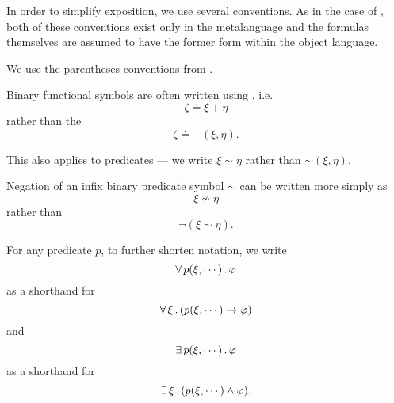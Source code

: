 \begin{remark}\label{rem:first_order_formula_conventions}
  In order to simplify exposition, we use several conventions. As in the case of , both of these conventions exist only in the metalanguage and the formulas themselves are assumed to have the former form within the object language.
  \begin{thmenum}
     We use the parentheses conventions from .

     Binary functional symbols are often written using , i.e.
    \begin{equation*}
      \zeta \doteq \xi + \eta
    \end{equation*}
    rather than the 
    \begin{equation*}
      \zeta \doteq +(\xi, \eta).
    \end{equation*}

    This also applies to predicates --- we write \( \xi \sim \eta \) rather than \( \sim(\xi, \eta) \).

     Negation of an infix binary predicate symbol \( \sim \) can be written more simply as
    \begin{equation*}
      \xi \not\sim \eta
    \end{equation*}
    rather than
    \begin{equation*}
      \neg(\xi \sim \eta).
    \end{equation*}

     For any predicate \( p \), to further shorten notation, we write
    \begin{equation*}
      \forall \thinspace p(\xi, \cdots) \thinspace . \thinspace \varphi
    \end{equation*}
    as a shorthand for
    \begin{equation*}
      \forall \thinspace \xi \thinspace . \thinspace (p(\xi, \cdots) \rightarrow \varphi)
    \end{equation*}
    and
    \begin{equation*}
      \exists \thinspace p(\xi, \cdots) \thinspace . \thinspace \varphi
    \end{equation*}
    as a shorthand for
    \begin{equation*}
      \exists \thinspace \xi \thinspace . \thinspace (p(\xi, \cdots) \wedge \varphi).
    \end{equation*}


\end{thmenum}
\end{remark}
